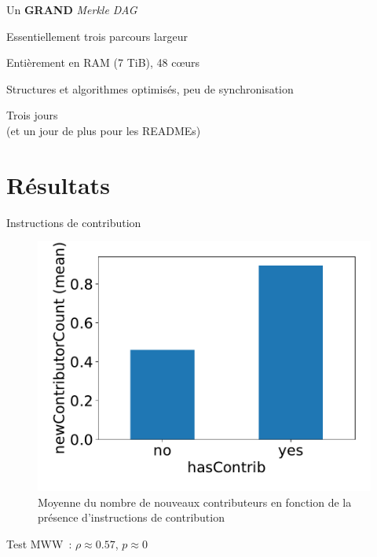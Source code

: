 \documentclass[usenames,dvipsnames,10pt]{beamer}
\begin{document}
\begin{frame}{Un \textbf{GRAND} \emph{Merkle DAG}}
    \centering

    Essentiellement trois parcours largeur
    \pause

    Entièrement en RAM (7 TiB), 48 cœurs
    \pause

    Structures et algorithmes optimisés, peu de synchronisation
    \pause
    \bigskip
    \bigskip

    {\huge Trois jours}\\{\footnotesize (et un jour de plus pour les READMEs)}


\end{frame}

\section{Résultats}

\begin{frame}{Instructions de contribution}
    \begin{figure}
        \includegraphics[width=.5\textwidth]{../experiment/data_analysis/hasContrib_meanNewContributorCount}
        \caption{%
            Moyenne du nombre de nouveaux contributeurs en fonction de la
            présence d'instructions de contribution
        }
    \end{figure}

    Test MWW : $\rho \approx 0.57$, $p \approx 0$

\end{frame}
\end{document}
